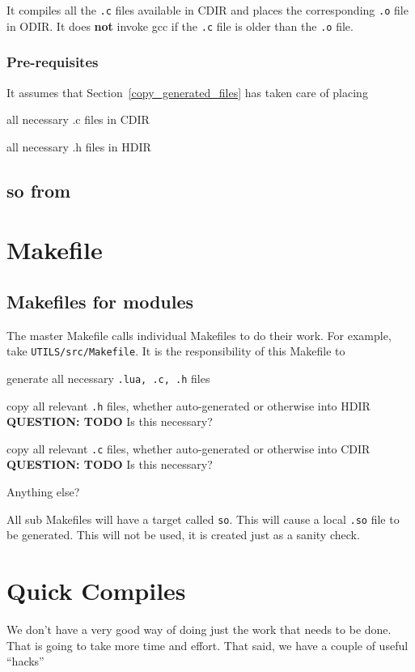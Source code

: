 It compiles all the {\tt .c} files available in CDIR and places 
the corresponding {\tt .o} file in ODIR. It does {\bf not} invoke gcc if the {\tt.c}
file is older than the {\tt .o} file. 


\subsubsection{Pre-requisites}
It assumes that Section~\ref{copy_generated_files} has taken care of placing
\be
\item all necessary .c files in CDIR
\item all necessary .h files in HDIR
\ee

\subsection{so from}
\label{so_from_o}
\TBC

\section{Makefile}

\subsection{Makefiles for modules}
The master Makefile calls individual Makefiles to do their work. For example,
take \verb+UTILS/src/Makefile+. It is the responsibility of this Makefile to
\be
\item generate all necessary {\tt .lua, .c, .h} files
\item copy all relevant \verb+.h+ files, whether auto-generated or otherwise
into HDIR  {\bf QUESTION: TODO } Is this necessary?
\item copy all relevant \verb+.c+ files, whether auto-generated or otherwise
into CDIR  {\bf QUESTION: TODO } Is this necessary?
\item Anything else? \TBC
\ee

All sub Makefiles will have a target called {\tt so}. This  will cause a local \verb+.so+ file to be generated. This will not be used, it is created
just as a sanity check.


\section{Quick Compiles}

We don't have a very good way of doing just the work that needs to be done. That
is going to take more time and effort. That said, we have a couple of useful
``hacks''

